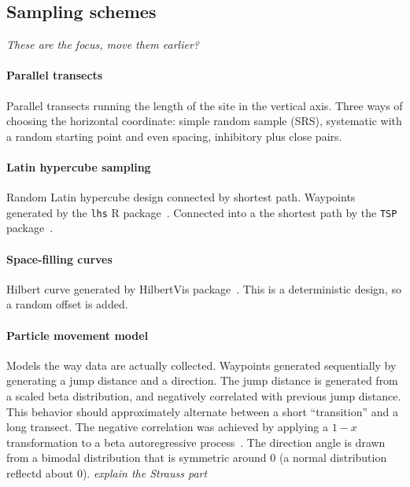 \documentclass[review]{elsarticle}
\begin{document}



\subsection{Sampling schemes}

{\it These are the focus, move them earlier?}

\paragraph{Parallel transects} Parallel transects running the length of the
site in the vertical axis. Three ways of choosing the horizontal coordinate:
simple random sample (SRS), systematic with a random starting point and even
spacing, inhibitory plus close pairs.

\paragraph{Latin hypercube sampling}
Random Latin hypercube design connected by shortest path. Waypoints generated
by the \texttt{lhs} R package~\cite{lhs}. Connected into a the shortest path
by the \texttt{TSP} package~\citep{tsp}.

\paragraph{Space-filling curves}
Hilbert curve generated by HilbertVis package~\citep{hilbertvis}. This is a
deterministic design, so a random offset is added.

\paragraph{Particle movement model}
Models the way data are actually collected. Waypoints generated sequentially by
generating a jump distance and a direction. The jump distance is generated from
a scaled beta distribution, and negatively correlated with previous jump
distance. This behavior should approximately alternate between a short
``transition'' and a long transect. The negative correlation was achieved by
applying a \(1 - x\) transformation to a beta autoregressive
process~\citep{mckenzie}. The direction angle is drawn from a bimodal
distribution that is symmetric around 0 (a normal distribution reflectd about
0). {\it explain the Strauss part}
\end{document}
